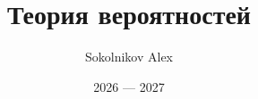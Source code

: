 

\title{\Huge Теория вероятностей}
\author{\huge Sokolnikov Alex}
\date{\LARGE 2026 --- 2027}


    \pagestyle{fancy}
    \maketitle
    \tableofcontents
    \newpage





